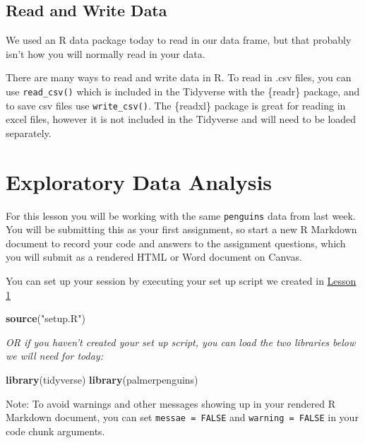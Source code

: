 \documentclass[
]{book}
\newenvironment{Shaded}{\begin{snugshade}}{\end{snugshade}}
\newcommand{\FunctionTok}[1]{\textcolor[rgb]{0.13,0.29,0.53}{\textbf{#1}}}
\newcommand{\NormalTok}[1]{#1}
\newcommand{\StringTok}[1]{\textcolor[rgb]{0.31,0.60,0.02}{#1}}
\begin{document}
\hypertarget{read-and-write-data}{%
\section{Read and Write Data}\label{read-and-write-data}}

We used an R data package today to read in our data frame, but that probably isn't how you will normally read in your data.

There are many ways to read and write data in R. To read in .csv files, you can use \texttt{read\_csv()} which is included in the Tidyverse with the \{readr\} package, and to save csv files use \texttt{write\_csv()}. The \{readxl\} package is great for reading in excel files, however it is not included in the Tidyverse and will need to be loaded separately.

\hypertarget{exploratory-data-analysis}{%
\chapter{Exploratory Data Analysis}\label{exploratory-data-analysis}}

For this lesson you will be working with the same \texttt{penguins} data from last week. You will be submitting this as your first assignment, so start a new R Markdown document to record your code and answers to the assignment questions, which you will submit as a rendered HTML or Word document on Canvas.

You can set up your session by executing your set up script we created in \protect\hyperlink{introduction-to-r-rstudio-and-r-markdown}{Lesson 1}

\begin{Shaded}
\begin{Highlighting}[]
\FunctionTok{source}\NormalTok{(}\StringTok{"setup.R"}\NormalTok{)}
\end{Highlighting}
\end{Shaded}

\emph{OR if you haven't created your set up script, you can load the two libraries below we will need for today:}

\begin{Shaded}
\begin{Highlighting}[]
\FunctionTok{library}\NormalTok{(tidyverse)}
\FunctionTok{library}\NormalTok{(palmerpenguins)}
\end{Highlighting}
\end{Shaded}

Note: To avoid warnings and other messages showing up in your rendered R Markdown document, you can set \texttt{messae\ =\ FALSE} and \texttt{warning\ =\ FALSE} in your code chunk arguments.
\end{document}
